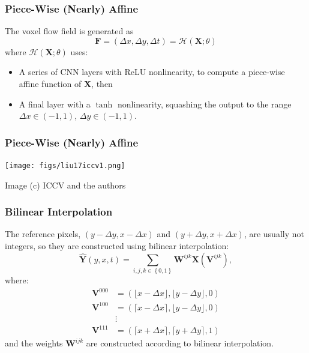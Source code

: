 \documentclass{beamer}
\begin{document}
\begin{frame}
  \frametitle{Piece-Wise (Nearly) Affine}

  The voxel flow field is generated as
  \begin{displaymath}
    \mathbf{F}=(\Delta x,\Delta y,\Delta t)={\mathcal H}\left(\mathbf{X};\theta\right)
  \end{displaymath}
  where ${\mathcal H}\left(\mathbf{X};\theta\right)$ uses:
  \begin{itemize}
  \item A series of CNN layers with ReLU nonlinearity, to compute a
    piece-wise affine function of $\mathbf{X}$, then
  \item A final layer with a $\tanh$ nonlinearity, squashing the output
    to the range $\Delta x\in\left(-1,1\right)$,
    $\Delta y\in\left(-1,1\right)$.
  \end{itemize}
\end{frame}

\begin{frame}
  \frametitle{Piece-Wise (Nearly) Affine}

  \centerline{\texttt{[image: figs/liu17iccv1.png]}}
  \begin{small}Image (c) ICCV and the authors\end{small}
\end{frame}

\begin{frame}
  \frametitle{Bilinear Interpolation}

  The reference pixels, $\left(y-\Delta y,x-\Delta x\right)$ and
  $\left(y+\Delta y,x+\Delta x\right)$, are usually not integers, so
  they are constructed using bilinear interpolation:
  \begin{displaymath}
    \mathbf{\hat{Y}}(y,x,t) =
    \sum_{i,j,k\in\left\{0,1\right\}}\mathbf{W}^{ijk}\mathbf{X}(\mathbf{V}^{ijk}),
  \end{displaymath}
  where:
  \begin{align*}
    \mathbf{V}^{000}&=\left(\lfloor x-\Delta x\rfloor,\lfloor y-\Delta y\rfloor,0\right)\\
    \mathbf{V}^{100}&=\left(\lceil x-\Delta x\rceil,\lfloor y-\Delta y\rfloor,0\right)\\
    &\vdots\\
    \mathbf{V}^{111}&=\left(\lceil x+\Delta x\rceil,\lceil y+\Delta y\rceil,1\right)
  \end{align*}
  and the weights $\mathbf{W}^{ijk}$ are constructed according to bilinear interpolation.
\end{frame}
    
\end{document}
